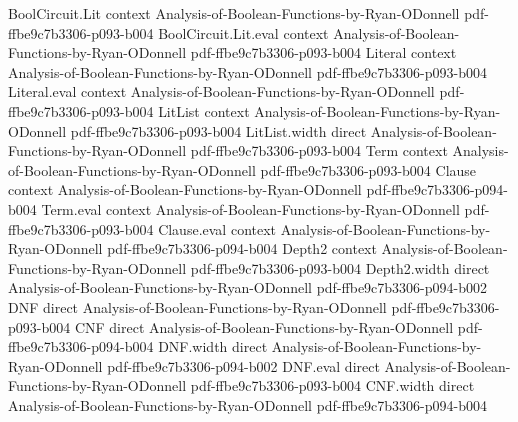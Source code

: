 \begin{lemma}
\label{BooleanAnalysis.GaussianSpace.hasInvarianceMoments_gaussianCoordinate}
\leanok
{}
\proofstep
  {BoolCircuit.Lit}
  {context}
  {Analysis-of-Boolean-Functions-by-Ryan-ODonnell}
  {pdf-ffbe9c7b3306-p093-b004}
\proofstep
  {BoolCircuit.Lit.eval}
  {context}
  {Analysis-of-Boolean-Functions-by-Ryan-ODonnell}
  {pdf-ffbe9c7b3306-p093-b004}
\proofstep
  {Literal}
  {context}
  {Analysis-of-Boolean-Functions-by-Ryan-ODonnell}
  {pdf-ffbe9c7b3306-p093-b004}
\proofstep
  {Literal.eval}
  {context}
  {Analysis-of-Boolean-Functions-by-Ryan-ODonnell}
  {pdf-ffbe9c7b3306-p093-b004}
\proofstep
  {LitList}
  {context}
  {Analysis-of-Boolean-Functions-by-Ryan-ODonnell}
  {pdf-ffbe9c7b3306-p093-b004}
\proofstep
  {LitList.width}
  {direct}
  {Analysis-of-Boolean-Functions-by-Ryan-ODonnell}
  {pdf-ffbe9c7b3306-p093-b004}
\proofstep
  {Term}
  {context}
  {Analysis-of-Boolean-Functions-by-Ryan-ODonnell}
  {pdf-ffbe9c7b3306-p093-b004}
\proofstep
  {Clause}
  {context}
  {Analysis-of-Boolean-Functions-by-Ryan-ODonnell}
  {pdf-ffbe9c7b3306-p094-b004}
\proofstep
  {Term.eval}
  {context}
  {Analysis-of-Boolean-Functions-by-Ryan-ODonnell}
  {pdf-ffbe9c7b3306-p093-b004}
\proofstep
  {Clause.eval}
  {context}
  {Analysis-of-Boolean-Functions-by-Ryan-ODonnell}
  {pdf-ffbe9c7b3306-p094-b004}
\proofstep
  {Depth2}
  {context}
  {Analysis-of-Boolean-Functions-by-Ryan-ODonnell}
  {pdf-ffbe9c7b3306-p093-b004}
\proofstep
  {Depth2.width}
  {direct}
  {Analysis-of-Boolean-Functions-by-Ryan-ODonnell}
  {pdf-ffbe9c7b3306-p094-b002}
\proofstep
  {DNF}
  {direct}
  {Analysis-of-Boolean-Functions-by-Ryan-ODonnell}
  {pdf-ffbe9c7b3306-p093-b004}
\proofstep
  {CNF}
  {direct}
  {Analysis-of-Boolean-Functions-by-Ryan-ODonnell}
  {pdf-ffbe9c7b3306-p094-b004}
\proofstep
  {DNF.width}
  {direct}
  {Analysis-of-Boolean-Functions-by-Ryan-ODonnell}
  {pdf-ffbe9c7b3306-p094-b002}
\proofstep
  {DNF.eval}
  {direct}
  {Analysis-of-Boolean-Functions-by-Ryan-ODonnell}
  {pdf-ffbe9c7b3306-p093-b004}
\proofstep
  {CNF.width}
  {direct}
  {Analysis-of-Boolean-Functions-by-Ryan-ODonnell}
  {pdf-ffbe9c7b3306-p094-b004}

\end{lemma}
